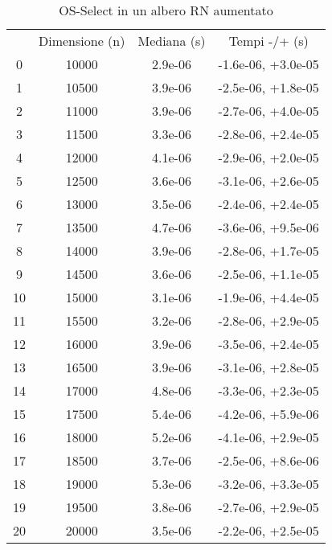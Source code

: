 \begin{table}
\centering
\caption{OS-Select in un albero RN aumentato}
\label{OS-Select in un albero RN aumentato}
\begin{adjustbox}{width=1\textwidth/2}
\begin{tabular}{|c|c|c|c|}
\hline
 & Dimensione (n) & Mediana (s) & Tempi -/+ (s) \\
0 & 10000 & 2.9e-06 & -1.6e-06, +3.0e-05 \\
\cline{1-4}
1 & 10500 & 3.9e-06 & -2.5e-06, +1.8e-05 \\
\cline{1-4}
2 & 11000 & 3.9e-06 & -2.7e-06, +4.0e-05 \\
\cline{1-4}
3 & 11500 & 3.3e-06 & -2.8e-06, +2.4e-05 \\
\cline{1-4}
4 & 12000 & 4.1e-06 & -2.9e-06, +2.0e-05 \\
\cline{1-4}
5 & 12500 & 3.6e-06 & -3.1e-06, +2.6e-05 \\
\cline{1-4}
6 & 13000 & 3.5e-06 & -2.4e-06, +2.4e-05 \\
\cline{1-4}
7 & 13500 & 4.7e-06 & -3.6e-06, +9.5e-06 \\
\cline{1-4}
8 & 14000 & 3.9e-06 & -2.8e-06, +1.7e-05 \\
\cline{1-4}
9 & 14500 & 3.6e-06 & -2.5e-06, +1.1e-05 \\
\cline{1-4}
10 & 15000 & 3.1e-06 & -1.9e-06, +4.4e-05 \\
\cline{1-4}
11 & 15500 & 3.2e-06 & -2.8e-06, +2.9e-05 \\
\cline{1-4}
12 & 16000 & 3.9e-06 & -3.5e-06, +2.4e-05 \\
\cline{1-4}
13 & 16500 & 3.9e-06 & -3.1e-06, +2.8e-05 \\
\cline{1-4}
14 & 17000 & 4.8e-06 & -3.3e-06, +2.3e-05 \\
\cline{1-4}
15 & 17500 & 5.4e-06 & -4.2e-06, +5.9e-06 \\
\cline{1-4}
16 & 18000 & 5.2e-06 & -4.1e-06, +2.9e-05 \\
\cline{1-4}
17 & 18500 & 3.7e-06 & -2.5e-06, +8.6e-06 \\
\cline{1-4}
18 & 19000 & 5.3e-06 & -3.2e-06, +3.3e-05 \\
\cline{1-4}
19 & 19500 & 3.8e-06 & -2.7e-06, +2.9e-05 \\
\cline{1-4}
20 & 20000 & 3.5e-06 & -2.2e-06, +2.5e-05 \\
\cline{1-4}
\end{tabular}
\end{adjustbox}
\end{table}

